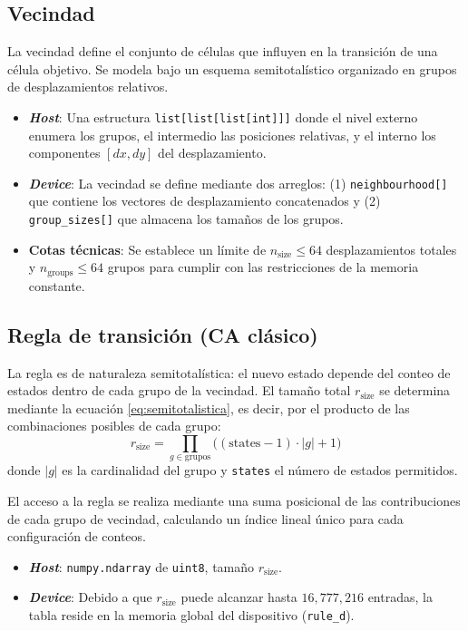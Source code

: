 \subsection{Vecindad}

La vecindad define el conjunto de células que influyen en la transición de una célula objetivo. Se modela bajo un esquema semitotalístico organizado en grupos de desplazamientos relativos.

\begin{itemize}
	\item \textbf{\textit{Host}}: Una estructura \texttt{list[list[list[int]]]} donde el nivel externo enumera los grupos, el intermedio las posiciones relativas, y el interno los componentes $[dx, dy]$ del desplazamiento.
	
	\item \textbf{\textit{Device}}: La vecindad se define mediante dos arreglos: (1) \texttt{neighbourhood[]} que contiene los vectores de desplazamiento concatenados y (2) \texttt{group\_sizes[]} que almacena los tamaños de los grupos. 
	
	\item \textbf{Cotas técnicas}: Se establece un límite de $n_{\text{size}} \leq 64$ desplazamientos totales y $n_{\text{groups}} \leq 64$ grupos para cumplir con las restricciones de la memoria constante.
\end{itemize}

\subsection{Regla de transición (CA clásico)}

La regla es de naturaleza semitotalística: el nuevo estado depende del conteo de estados dentro de cada grupo de la vecindad. El tamaño total $r_{\text{size}}$ se determina mediante la ecuación \ref{eq:semitotalistica}, es decir, por el producto de las combinaciones posibles de cada grupo:
\[
r_{\text{size}} = \prod_{g \in \text{grupos}} \big((\text{states}-1)\cdot |g| + 1\big)
\]
donde $|g|$ es la cardinalidad del grupo y \texttt{states} el número de estados permitidos.

El acceso a la regla se realiza mediante una suma posicional de las contribuciones de cada grupo de vecindad, calculando un índice lineal único para cada configuración de conteos.

\begin{itemize}
	\item \textbf{\textit{Host}}: \texttt{numpy.ndarray} de \texttt{uint8}, tamaño $r_{\text{size}}$.
	
	\item \textbf{\textit{Device}}: Debido a que $r_{\text{size}}$ puede alcanzar hasta $16{,}777{,}216$ entradas, la tabla reside en la memoria global del dispositivo (\texttt{rule\_d}).
\end{itemize}


